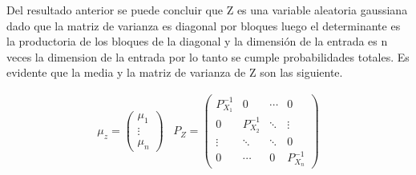 	Del resultado anterior se puede concluir que Z es una variable aleatoria gaussiana dado que la matriz de varianza es diagonal por bloques luego el determinante es la productoria de los bloques de la diagonal y la dimensión de la entrada es n veces la dimension de la entrada por lo tanto se cumple probabilidades totales.  Es evidente que la media y la matriz de varianza de Z son las siguiente.

	\begin{eqnarray}
		\mu_z = \begin{pmatrix}
			   \mu_1 \\
			  \vdots \\
			  \mu_n 
			 \end{pmatrix}\;\;\;
		P_Z =  \begin{pmatrix}
			  P_{X_1}^{-1} & 0 & \cdots & 0 \\
			  0 & P_{X_2}^{-1} &  \ddots & \vdots\\
			   \vdots & \ddots &\ddots  & 0\\
			   0 & \cdots &  0 & P_{X_n}^{-1}
			 \end{pmatrix}
	\end{eqnarray}







